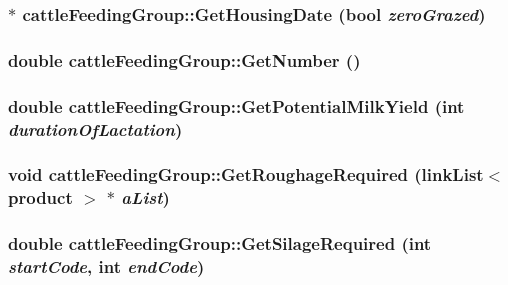\label{classcattle_feeding_group_a7f6f95c30e21858d046012f881b01e98}
\hypertarget{classcattle_feeding_group_a931bbdf43c3c84f1deaf7c3fdf28057d}{
\subsubsection[{GetHousingDate}]{ $\ast$ cattleFeedingGroup::GetHousingDate (bool {\em zeroGrazed})}}
\label{classcattle_feeding_group_a931bbdf43c3c84f1deaf7c3fdf28057d}
\hypertarget{classcattle_feeding_group_ad0d0a50e79dbe845d4b1d758aeac13a6}{
\subsubsection[{GetNumber}]{\setlength{\rightskip}{0pt plus 5cm}double cattleFeedingGroup::GetNumber ()}}
\label{classcattle_feeding_group_ad0d0a50e79dbe845d4b1d758aeac13a6}
\hypertarget{classcattle_feeding_group_ad7ec765b9f8860e45628d43af6ec8fde}{
\subsubsection[{GetPotentialMilkYield}]{\setlength{\rightskip}{0pt plus 5cm}double cattleFeedingGroup::GetPotentialMilkYield (int {\em durationOfLactation})}}
\label{classcattle_feeding_group_ad7ec765b9f8860e45628d43af6ec8fde}
\hypertarget{classcattle_feeding_group_a4373e70dc994d95875f88f886e217718}{
\subsubsection[{GetRoughageRequired}]{\setlength{\rightskip}{0pt plus 5cm}void cattleFeedingGroup::GetRoughageRequired ({\bf linkList}$<$ {\bf product} $>$ $\ast$ {\em aList})}}
\label{classcattle_feeding_group_a4373e70dc994d95875f88f886e217718}
\hypertarget{classcattle_feeding_group_a57898f313dd869bc2b3ed50dfd60c2ee}{
\subsubsection[{GetSilageRequired}]{\setlength{\rightskip}{0pt plus 5cm}double cattleFeedingGroup::GetSilageRequired (int {\em startCode}, \/  int {\em endCode})}}

